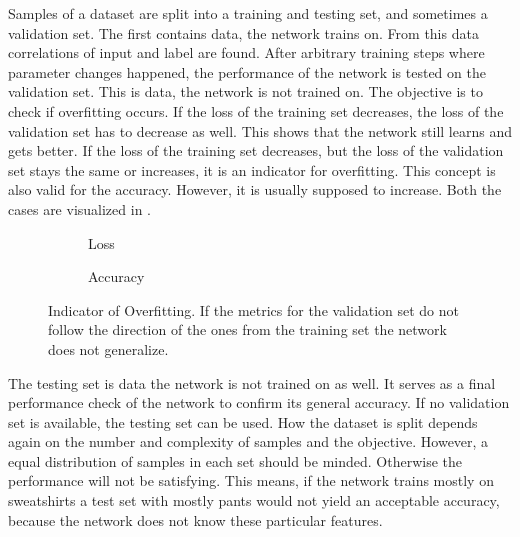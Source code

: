 Samples of a dataset are split into a training and testing set, and sometimes a validation set\cite{James2014}.
The first contains data, the network trains on.
From this data correlations of input and label are found.
After arbitrary training steps where parameter changes happened, the performance of the network is tested on the validation set.
This is data, the network is not trained on.
The objective is to check if overfitting occurs.
If the loss of the training set decreases, the loss of the validation set has to decrease as well.
This shows that the network still learns and gets better.
If the loss of the training set decreases, but the loss of the validation set stays the same or increases, it is an indicator for overfitting.
This concept is also valid for the accuracy.
However, it is usually supposed to increase.
Both the cases are visualized in .
\begin{figure}
	\setlength{}
	\setlength{}
	\centering
	\begin{subfigure}{.5\textwidth}
		
		\caption[Loss]{Loss}
	\end{subfigure}%
	\begin{subfigure}{.5\textwidth}
		
		\caption[Accuracy]{Accuracy}
	\end{subfigure}
	\caption[Indicator of Overfitting]{Indicator of Overfitting. If the metrics for the validation set do not follow the direction of the ones from the training set the network does not generalize.}
	\label{fig:overfitting}
\end{figure}

The testing set is data the network is not trained on as well.
It serves as a final performance check of the network to confirm its general accuracy.
If no validation set is available, the testing set can be used.
How the dataset is split depends again on the number and complexity of samples and the objective.
However, a equal distribution of samples in each set should be minded.
Otherwise the performance will not be satisfying.
This means, if the network trains mostly on sweatshirts a test set with mostly pants would not yield an acceptable accuracy, because the network does not know these particular features.


